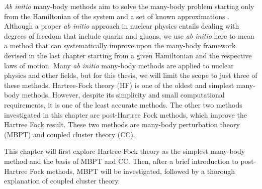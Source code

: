 \textit{Ab initio} many-body methods aim to solve the many-body problem starting only from the Hamiltonian of the system and a set of known approximations \cite{Ref6}. Although a proper \textit{ab initio} approach in nuclear physics entails dealing with degrees of freedom that include quarks and gluons, we use \textit{ab initio} here to mean a method that can systematically improve upon the many-body framework devised in the last chapter starting from a given Hamiltonian and the respective laws of motion. Many \textit{ab initio} many-body methods are applied to nuclear physics and other fields, but for this thesis, we will limit the scope to just three of these methods. Hartree-Fock theory (HF) is one of the oldest and simplest many-body methods. However, despite its simplicity and small computational requirements, it is one of the least accurate methods. The other two methods investigated in this chapter are post-Hartree Fock methods, which improve the Hartree Fock result. These two methods are many-body perturbation theory (MBPT) and coupled cluster theory (CC).

This chapter will first explore Hartree-Fock theory as the simplest many-body method and the basis of MBPT and CC. Then, after a brief introduction to post-Hartree Fock methods, MBPT will be investigated, followed by a thorough explanation of coupled cluster theory. 